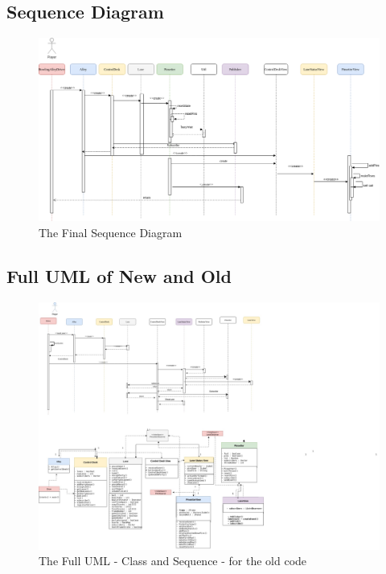 \subsection{Sequence Diagram}

\begin{figure}[H]
    \centering
    \includegraphics[width = \textwidth]{uml/New_seq.png}
    \caption{The Final Sequence Diagram}
\end{figure}

\subsection{Full UML of New and Old}

\begin{figure}[H]
    \centering
    \includegraphics[width = \textwidth]{uml/Old_full.jpg}
    \caption{The Full UML - Class and Sequence - for the old code}
\end{figure}

